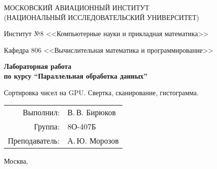\begin{titlepage}
\begin{center}
\large
МОСКОВСКИЙ АВИАЦИОННЫЙ ИНСТИТУТ\\ (НАЦИОНАЛЬНЫЙ ИССЛЕДОВАТЕЛЬСКИЙ УНИВЕРСИТЕТ)

\vspace{20pt}

Институт №8 <<Компьютерные науки и прикладная математика>>

Кафедра 806 <<Вычислительная математика и программирование>>
\end{center}

\vspace{60pt}

\begin{center}
\bfseries
\large
Лабораторная работа  \\по курсу \enquote{Параллельная обработка данных}

\vspace{54pt}

Сортировка чисел на GPU. Свертка, сканирование, гистограмма.
\end{center}

\vfill

\begin{flushright}
\large
\begin{tabular}{rl}
Выполнил: & В.\,В. Бирюков \\
Группа: & 8О-407Б \\
Преподаватель: & А.\,Ю. Морозов \\
\end{tabular}
\end{flushright}

\vspace{92pt}

\begin{center}
\large
Москва, \the\year
\end{center}
\end{titlepage}

\pagebreak
